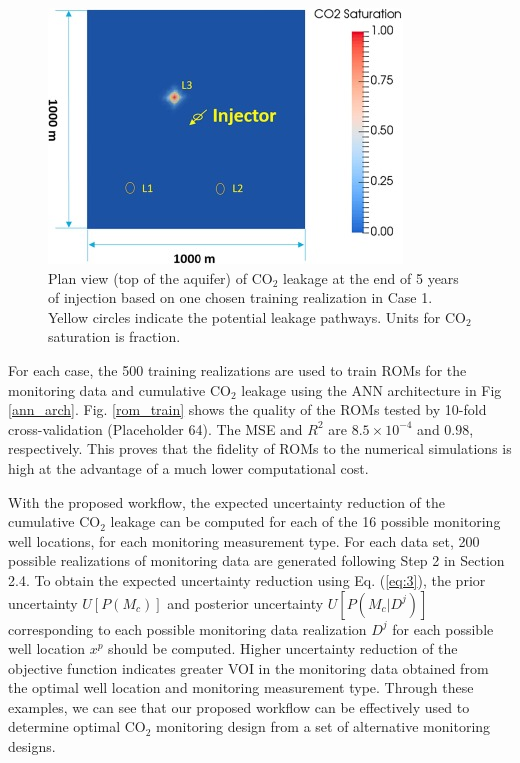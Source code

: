 \documentclass[10pt, twoside]{article}
\begin{document}
\begin{figure} [H]
\centering
\includegraphics[width=10 cm]{Figure 9.jpg}
\caption{Plan view (top of the aquifer) of CO$_2$ leakage at the end of 5 years of injection based on one chosen training realization in Case 1. Yellow circles indicate the potential leakage pathways. Units for CO$_2$ saturation is fraction.}
\label{cum_leak_map}
\end{figure}

For each case, the 500 training realizations are used to train ROMs for the monitoring data and cumulative CO$_2$ leakage using the ANN architecture in Fig \ref{ann_arch}. Fig. \ref{rom_train} shows the quality of the ROMs tested by 10-fold cross-validation (Placeholder 64). The MSE and $R^2$ are $8.5\times10^{-4}$ and $0.98$, respectively. This proves that the fidelity of ROMs to the numerical simulations is high at the advantage of a much lower computational cost.

With the proposed workflow, the expected uncertainty reduction of the cumulative CO$_2$ leakage can be computed for each of the 16 possible monitoring well locations, for each monitoring measurement type. For each data set, 200 possible realizations of monitoring data are generated following Step 2 in Section 2.4. To obtain the expected uncertainty reduction using Eq. (\ref{eq:3}), the prior uncertainty $U[P(M_c)]$ and posterior uncertainty $U[P(M_c \vert D^j)]$ corresponding to each possible monitoring data realization $D^j$ for each possible well location $x^p$ should be computed. Higher uncertainty reduction of the objective function indicates greater VOI in the monitoring data obtained from the optimal well location and monitoring measurement type. Through these examples, we can see that our proposed workflow can be effectively used to determine optimal CO$_2$ monitoring design from a set of alternative monitoring designs.
\end{document}
